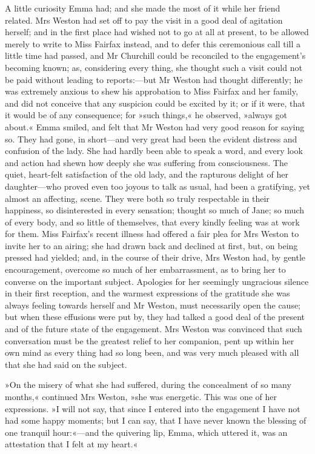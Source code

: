 A little curiosity Emma had; and she made the most of it while her friend related. Mrs Weston had set off to pay the visit in a good deal of agitation herself; and in the first place had wished not to go at all at present, to be allowed merely to write to Miss Fairfax instead, and to defer this ceremonious call till a little time had passed, and Mr Churchill could be reconciled to the engagement's becoming known; as, considering every thing, she thought such a visit could not be paid without leading to reports:—but Mr Weston had thought differently; he was extremely anxious to shew his approbation to Miss Fairfax and her family, and did not conceive that any suspicion could be excited by it; or if it were, that it would be of any consequence; for »such things,« he observed, »always got about.« Emma smiled, and felt that Mr Weston had very good reason for saying so. They had gone, in short—and very great had been the evident distress and confusion of the lady. She had hardly been able to speak a word, and every look and action had shewn how deeply she was suffering from consciousness. The quiet, heart-felt satisfaction of the old lady, and the rapturous delight of her daughter—who proved even too joyous to talk as usual, had been a gratifying, yet almost an affecting, scene. They were both so truly respectable in their happiness, so disinterested in every sensation; thought so much of Jane; so much of every body, and so little of themselves, that every kindly feeling was at work for them. Miss Fairfax's recent illness had offered a fair plea for Mrs Weston to invite her to an airing; she had drawn back and declined at first, but, on being pressed had yielded; and, in the course of their drive, Mrs Weston had, by gentle encouragement, overcome so much of her embarrassment, as to bring her to converse on the important subject. Apologies for her seemingly ungracious silence in their first reception, and the warmest expressions of the gratitude she was always feeling towards herself and Mr Weston, must necessarily open the cause; but when these effusions were put by, they had talked a good deal of the present and of the future state of the engagement. Mrs Weston was convinced that such conversation must be the greatest relief to her companion, pent up within her own mind as every thing had so long been, and was very much pleased with all that she had said on the subject.

»On the misery of what she had suffered, during the concealment of so many months,« continued Mrs Weston, »she was energetic. This was one of her expressions. »I will not say, that since I entered into the engagement I have not had some happy moments; but I can say, that I have never known the blessing of one tranquil hour:«—and the quivering lip, Emma, which uttered it, was an attestation that I felt at my heart.«

